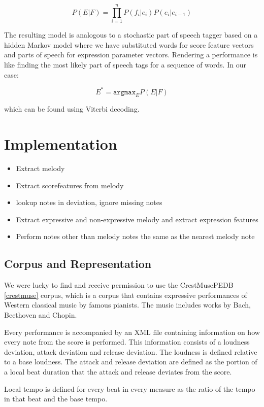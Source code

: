 \documentclass[a4paper,10pt]{article}
\begin{document}
\begin{equation}
P(E|F) = \displaystyle\prod_{i=1}^{n}P(f_i|e_i)P(e_i|e_{i-1})
\end{equation}

The resulting model is analogous to a stochastic part of speech tagger based on a hidden Markov model where we have substituted words for score feature vectors and parts of speech for expression parameter vectors. Rendering a performance is like finding the most likely part of speech tags for a sequence of words. In our case:

\[E^* = \texttt{argmax}_E P(E|F)\]

which can be found using Viterbi decoding.

\section{Implementation}


\begin{itemize}
\item Extract melody
\item Extract scorefeatures from melody
\item lookup notes in deviation, ignore missing notes
\item Extract expressive and non-expressive melody and extract expression features
\item Perform notes other than melody notes the same as the nearest melody note
\end{itemize}
\subsection{Corpus and Representation}
We were lucky to find and receive permission to use the CrestMusePEDB \ref{crestmuse} corpus, which is a corpus that contains expressive performances of Western classical music by famous pianists. The music includes works by Bach, Beethoven and Chopin.

Every performance is accompanied by an XML file containing information on how every note from the score is performed. This information consists of a loudness deviation, attack deviation and release deviation. The loudness is defined relative to a base loudness. The attack and release deviation are defined as the portion of a local beat duration that the attack and release deviates from the score. 

Local tempo is defined for every beat in every measure as the ratio of the tempo in that beat and the base tempo. 
\end{document}
